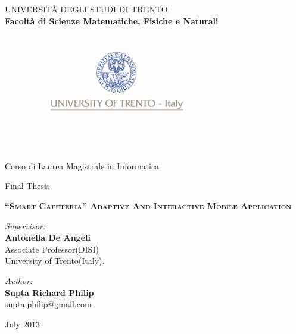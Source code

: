 \begin{titlepage}
\pagestyle{plain}

\thispagestyle{empty}
\begin{center}

 \LARGE UNIVERSIT\`A DEGLI STUDI DI TRENTO\\

\textbf{\large Facolt\`a di Scienze Matematiche, Fisiche e Naturali
   }\\

\begin{figure}[h!]
 \centerline{\includegraphics[width=0.7\textwidth,height=2in]{Logo/ulogo}}
\end{figure}
\begin{center}
Corso di Laurea Magistrale in Informatica
\end{center}
\hrulefill
\begin{center}
Final Thesis
\end{center}
\end{center}
\vspace{0.3 cm} %
\begin{center}
 \LARGE \textsc{\textbf{``Smart Cafeteria'' Adaptive And Interactive Mobile Application} \\}
\end{center}
\vspace{2cm}

\begin{minipage}{0.5\textwidth}
\begin{flushleft} 
\large
\emph{Supervisor:} \\
\textbf{Antonella De Angeli}\\
Associate Professor(DISI)\\
University of Trento(Italy).
\end{flushleft}
\end{minipage}
\begin{minipage}{0.5\textwidth}
\begin{flushright} 
\large
\emph{Author:}\\
\textbf{Supta Richard Philip}\\
\small supta.philip@gmail.com
\end{flushright}
\end{minipage}

\vspace{1.4cm}
\begin{center}
July $2013$
\end{center}
\end{titlepage}